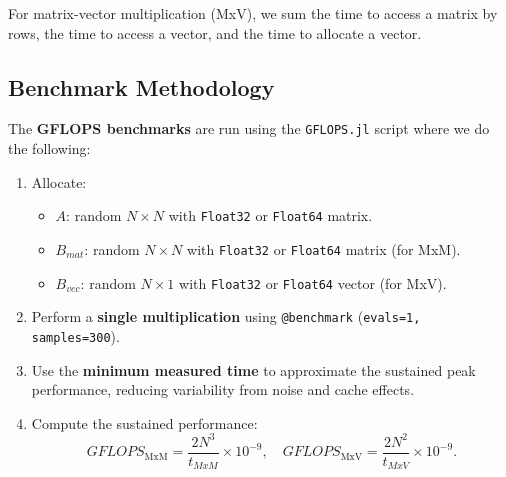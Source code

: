 For matrix-vector multiplication (MxV), we sum the time to access a matrix by rows, the time to access a vector, and the time to allocate a vector.

\clearpage

\subsection{Benchmark Methodology}

The \textbf{GFLOPS benchmarks} are run using the \texttt{GFLOPS.jl} script where we do the following:
\begin{enumerate}
    \item Allocate:
    \begin{itemize}
        \item $A$: random $N \times N$ with \texttt{Float32} or \texttt{Float64} matrix.
        \item $B_{mat}$: random $N \times N$ with \texttt{Float32} or \texttt{Float64} matrix (for MxM).
        \item $B_{vec}$: random $N \times 1$ with \texttt{Float32} or \texttt{Float64} vector (for MxV).
    \end{itemize}
    \item Perform a \textbf{single multiplication} using \texttt{@benchmark} (\texttt{evals=1, samples=300}).
    \item Use the \textbf{minimum measured time} to approximate the sustained peak performance, reducing variability from noise and cache effects.
    \item Compute the sustained performance:
    \[
    GFLOPS_{\mathrm{MxM}} = \frac{2 N^3}{t_{MxM}} \times 10^{-9}, \quad
    GFLOPS_{\mathrm{MxV}} = \frac{2 N^2}{t_{MxV}} \times 10^{-9}.
    \]
\end{enumerate}

